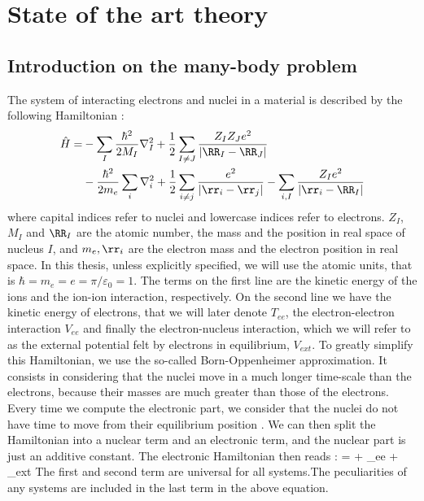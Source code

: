 \linenumbers
\chapter{ State of the art theory}
\chaptertoc{}

\section{Introduction on the many-body problem}
The system of interacting electrons and nuclei in a material is described by the following Hamiltonian :
\begin{align}
	\hat{H} = &- \sum_I \frac{\hbar^2}{2 M_I} \nabla^2_I + \frac{1}{2} \sum_{I\neq J} \frac{Z_I Z_J e^2}{\left| \RR_I - \RR_J \right|} \nonumber \\
	&- \frac{\hbar^2}{2m_e} \sum_i \nabla^2_i + \frac{1}{2} \sum_{i\neq j} \frac{e^2}{\left| \rr_i - \rr_j \right|} - \sum_{i,I} \frac{Z_I e^2}{\left|\rr_i - \RR_I \right|}
\end{align}
where capital indices refer to nuclei and lowercase indices refer to electrons. $Z_I$, $M_I$ and $\RR_I$ are the atomic number, the mass and the position in real space of nucleus $I$, and $m_e,\rr_i$ are the electron mass and the electron position in real space. In this thesis, unless explicitly specified, we will use the atomic units, that is $\hbar = m_e = e =\pi/\varepsilon_0 =1$.
The terms on the first line are the kinetic energy of the ions and the ion-ion interaction, respectively. On the second line we have the kinetic energy of electrons, that we will later denote $T_{ee}$, the electron-electron interaction $V_{ee}$ and finally the electron-nucleus interaction, which we will refer to as the external potential felt by electrons in equilibrium, $V_{ext}$. To greatly simplify this Hamiltonian, we use the so-called Born-Oppenheimer approximation. It consists in considering that the nuclei move in a much longer time-scale than the electrons, because their masses are much greater than those of the electrons. Every time we compute the electronic part, we consider that the nuclei do not have time to move from their equilibrium position \cite{monserrat2018electron}. We can then split the Hamiltonian into a nuclear term and an electronic term, and the nuclear part is just an additive constant. The electronic Hamiltonian then reads :
\be
	 =  + _{ee} + _{ext}
\ee
The first and second term are universal for all systems.The peculiarities of any systems are included in the last term in the above equation.

